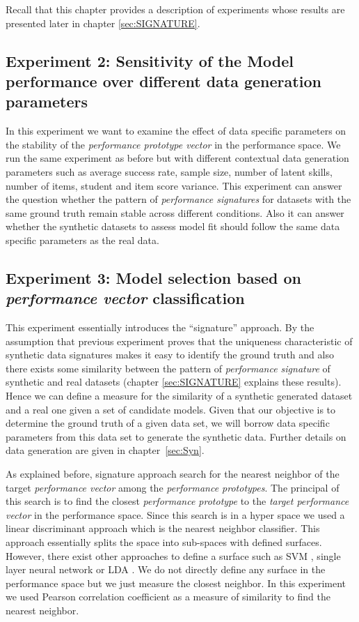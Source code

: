 Recall that this chapter provides a description of experiments whose results are presented later in chapter \ref{sec:SIGNATURE}.

\subsection{Experiment 2: Sensitivity of the Model performance over different data generation parameters}
\label{Sensitive}

In this experiment we want to examine the effect of data specific parameters on the stability of the \textit{performance prototype vector} in the performance space. We run the same experiment as before but with different contextual data generation parameters such as average success rate, sample size, number of latent skills, number of items, student and item score variance. This experiment can answer the question whether the pattern of \textit{performance signatures} for datasets with the same ground truth remain stable across different conditions. Also it can answer whether the synthetic datasets to assess model fit should follow the same data specific parameters as the real data.


\subsection{Experiment 3: Model selection based on \textit{performance vector} classification}
\label{Sigapproach-measure}
This experiment essentially introduces the ``signature'' approach. By the assumption that previous experiment proves that the uniqueness characteristic of synthetic data signatures makes it easy to identify the ground truth and also there exists some similarity between the pattern of \textit{performance signature} of synthetic and real datasets (chapter \ref{sec:SIGNATURE} explains these results). Hence we can define a measure for the similarity of a synthetic generated dataset and a real one given a set of candidate models. Given that our objective is to determine the ground truth of a given data set, we will borrow data specific parameters from this data set to generate the synthetic data. Further details on data generation are given in chapter~\ref{sec:Syn}. 

As explained before, signature approach search for the nearest neighbor of the target \textit{performance vector} among the \textit{performance prototypes}. The principal of this search is to find the closest \textit{performance prototype} to the \textit{target performance vector} in the performance space. Since this search is in a hyper space we used a linear discriminant approach which is the nearest neighbor classifier. This approach essentially splits the space into sub-spaces with defined surfaces. However, there exist other approaches to define a surface such as SVM \citep{cortes1995support,suykens2002least}, single layer neural network \citep{lippmann1987introduction} or LDA \citep{mclachlan2004discriminant,scholkopft1999fisher}. We do not directly define any surface in the performance space but we just measure the closest neighbor. In this experiment we used Pearson correlation coefficient as a measure of similarity to find the nearest neighbor.

